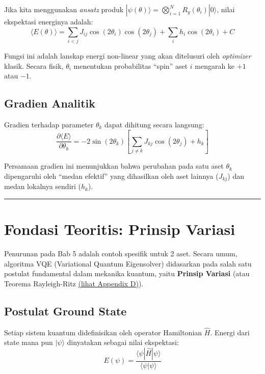 \documentclass[12pt,a4paper]{article}
\begin{document}
Jika kita menggunakan \emph{ansatz} produk \(|\psi(\theta)\rangle = \bigotimes_{i=1}^N R_y(\theta_i)|0\rangle\), nilai ekspektasi energinya adalah: \[ \langle E(\theta) \rangle = \sum_{i<j} J_{ij} \cos(2\theta_i)\cos(2\theta_j) + \sum_i h_i \cos(2\theta_i) + C \]

Fungsi ini adalah lanskap energi non-linear yang akan ditelusuri oleh \emph{optimizer} klasik. Secara fisik, \(\theta_i\) menentukan probabilitas ``spin'' aset \(i\) mengarah ke \(+1\) atau \(-1\).

\hypertarget{b.-gradien-analitik}{%
\subsection{Gradien Analitik}\label{b.-gradien-analitik}}

Gradien terhadap parameter \(\theta_k\) dapat dihitung secara langsung: \[ \frac{\partial \langle E \rangle}{\partial \theta_k} = -2\sin(2\theta_k) \left[ \sum_{j \neq k} J_{kj} \cos(2\theta_j) + h_k \right] \]

Persamaan gradien ini menunjukkan bahwa perubahan pada satu aset \(\theta_k\) dipengaruhi oleh ``medan efektif'' yang dihasilkan oleh aset lainnya (\(J_{kj}\)) dan medan lokalnya sendiri (\(h_k\)).

\begin{center}\rule{0.5\linewidth}{0.5pt}\end{center}

\hypertarget{fondasi-teoritis-prinsip-variasi}{%
\section{Fondasi Teoritis: Prinsip Variasi}\label{fondasi-teoritis-prinsip-variasi}}

Penurunan pada Bab 5 adalah contoh spesifik untuk 2 aset. Secara umum, algoritma VQE (Variational Quantum Eigensolver) didasarkan pada salah satu postulat fundamental dalam mekanika kuantum, yaitu \textbf{Prinsip Variasi} (atau Teorema Rayleigh-Ritz \hyperref[appendix-d]{(lihat Appendix D)}).

\hypertarget{a.-postulat-ground-state}{%
\subsection{Postulat Ground State}\label{a.-postulat-ground-state}}

Setiap sistem kuantum didefinisikan oleh operator Hamiltonian \(\hat{H}\). Energi dari state mana pun \(|\psi\rangle\) dinyatakan sebagai nilai ekspektasi: \[ E(\psi) = \frac{\langle \psi | \hat{H} | \psi \rangle}{\langle \psi | \psi \rangle} \]
\end{document}
